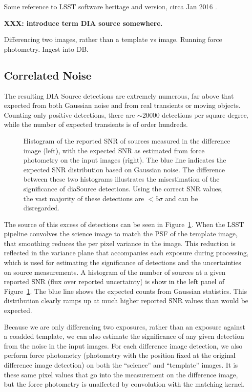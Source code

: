 Some reference to LSST software heritage and version, circa Jan 2016
\citep{juric15}.

\textbf{XXX: introduce term DIA source somewhere.}

Differencing two images, rather than a template vs image. Running force
photometry. Ingest into DB.

\subsection{Correlated Noise}

The resulting DIA Source detections are extremely numerous, far above that
expected from both Gaussian noise and from real transients or moving objects.
Counting only positive detections, there are $\sim 20 000$ detections per
square degree, while the number of expected transients is of order hundreds.

\begin{figure}
  \centering
  \caption{
  Histogram of the reported SNR of sources measured in the difference image
  (left), with the expected SNR as estimated from force photometry on the input
  images (right). The blue line indicates the expected SNR distribution based
  on Gaussian noise. The difference between these two histograms illustrates the
  misestimation of the significance of diaSource detections. Using the correct
  SNR values, the vast majority of these detections are $<5 \sigma$ and can be
  disregarded.
  }
  \label{fig:snr_comparison}
\end{figure}

The source of this excess of detections can be seen in
Figure~\ref{fig:snr_comparison}. When the LSST pipeline convolves the science
image to match the PSF of the template image, that smoothing reduces the per
pixel variance in the image. This reduction is reflected in the variance plane
that accompanies each exposure during processing, which is used for estimating
the significance of detections and the uncertainties on source measurements. A
histogram of the number of sources at a given reported SNR (flux over reported
uncertainty) is show in the left panel of Figure~\ref{fig:snr_comparison}. The
blue line shows the expected counts from Gaussian statistics. This distribution
clearly ramps up at much higher reported SNR values than would be expected.

Because we are only differencing two exposures, rather than an exposure against
a coadded template, we can also estimate the significance of any given detection
from the noise in the input images. For each difference image detection, we also
perform force photometry (photometry with the position fixed at the original
difference image detection) on both the ``science'' and ``template'' images. It
is these same pixel values that go into the measurement on the difference image,
but the force photometry is unaffected by convolution with the matching kernel.

